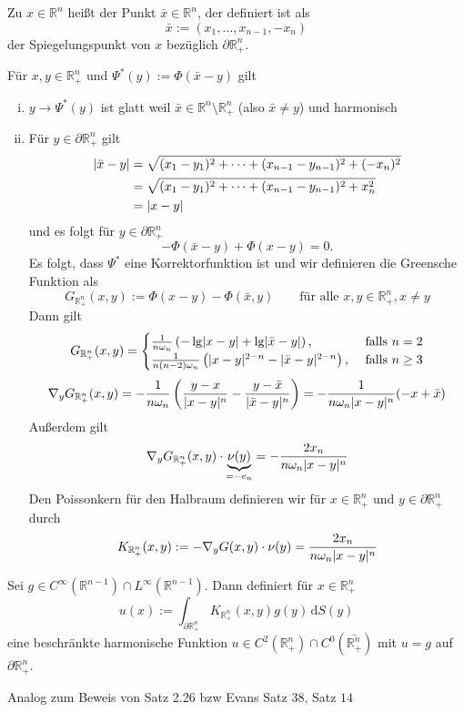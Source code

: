\begin{definition}
	Zu $x \in \mathbb{R}^n$ heißt der Punkt $\bar{x} \in \mathbb{R}^n$, der definiert ist als 
	\[
		\bar{x} := (x_1, \dots, x_{n-1},-x_n) 
	\]
	der Spiegelungspunkt von $x$ bezüglich $\partial \mathbb{R}^n_+$. 
\end{definition}
	Für $x,y \in \mathbb{R}^n_+$ und $\Psi^*(y):= \Phi(\bar{x}-y)$ gilt
	\begin{enumerate}[(i)]
		\item $y \to \Psi^*(y)$ ist glatt weil $\bar{x} \in \mathbb{R}^n \setminus \mathbb{R}^n_+$ (also $\bar{x} \neq y$) und harmonisch
		\item Für $y \in \partial \mathbb{R}^n_+$ gilt
		\begin{align*}
			\lvert\bar{x}-y\rvert &= \sqrt{(x_1-y_1)^2+ \dots + (x_{n-1}-y_{n-1})^2 + (-x_n)^2} \\
			&= \sqrt{(x_1-y_1)^2+ \dots + (x_{n-1}-y_{n-1})^2 + x_n^2} \\
			&= \lvert x-y\rvert
		\end{align*}
		und es folgt für $y \in \partial \mathbb{R}^n_+$ \[
			-\Phi(\bar{x}-y)+  \Phi(x-y) = 0.
		\] 
		Es folgt, dass $\Psi^*$ eine Korrektorfunktion ist und wir definieren die Greensche Funktion als
		\[
			G_{\mathbb{R}^n_+}(x,y) := \Phi(x-y) - \Phi(\bar{x},y) \qquad \text{für alle }x,y \in \mathbb{R}^n_+, x \neq y
		\]
		Dann gilt
		\[
				G_{\mathbb{R}^n_+}(x,y) = \begin{cases}
					\frac{1}{n \omega_n} \left( -  \lg \lvert x-y\rvert + \lg \lvert\bar{x}-y\rvert \right), &\text{ falls }n=2\\
					\frac{1}{n(n-2)\omega_n} \left( \lvert x-y\rvert^{2-n}- \lvert\bar{x}-y\rvert^{2-n} \right), &\text{ falls }n \geq 3
				\end{cases}
		\]
		\[
			 \nabla_y G_{\mathbb{R}^n_+}(x,y) = - \frac{1}{n \omega_n} \left( \frac{y-x}{\lvert x-y\rvert^n} - \frac{y - \bar{x}}{\lvert\bar{x}-y\rvert^n} \right)
			 = - \frac{1}{n \omega_n \lvert x-y\rvert^n} (-x + \bar{x})
		\]
		Außerdem gilt
		\[
			  \nabla_y G_{\mathbb{R}^n_+}(x,y) \cdot \underset{=-e_n}{\underbrace{\nu(y)}} = - \frac{2 x_n}{n \omega_n \lvert x-y\rvert^n}
		\]
		Den Poissonkern für den Halbraum definieren wir für $x \in \mathbb{R}^n_+$ und $y \in  \partial \mathbb{R}^n_+$ durch
		\[
			K_{\mathbb{R}^n_+}(x,y) := -  \nabla_y G(x,y) \cdot \nu(y) = \frac{2x_n}{n \omega_n \lvert x-y\rvert^n}
		\]
	\end{enumerate}

\begin{satz}
	Sei $g \in C^{\infty}(\mathbb{R}^{n-1})\cap L^{\infty}(\mathbb{R}^{n-1})$. Dann definiert für $x \in \mathbb{R}^n_+$
	\[
		u(x):= \int_{\partial \mathbb{R}^n_+}^{} K_{\mathbb{R}^n_+}(x,y)g(y) \,\mathrm{d}S(y)
	\]
	eine beschränkte harmonische Funktion $u \in C^2(\mathbb{R}^n_+) \cap C^0(\bar{\mathbb{R}^n_+})$ mit $u =g$ auf $ \partial \mathbb{R}^n_+$.
\end{satz}
\begin{beweis}
	Analog zum Beweis von Satz 2.26 bzw Evans Satz $38$, Satz $14$
\end{beweis}

